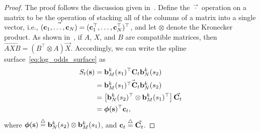 \begin{proof}
The proof follows the discussion given in~\cite{RodriguesTsiogkasAguiar20}.
%
Define the $\vec{\cdot}$ operation on a matrix to be the operation of stacking all of the columns of a matrix into a single vector, i.e., $\vec{(\mathbf{c}_1, \dots, \mathbf{c}_N)}=(\mathbf{c}_1^\top, \dots, \mathbf{c}_N^\top)^\top$, and let $\otimes$ denote the Kronecker product. As shown in~\cite{Kronecker_vect}, if $A$, $X$, and $B$ are compatible matrices, then $\vec{AXB}=(B^\top \otimes A)\vec{X}$.  Accordingly, we can write the spline surface~\eqref{eq:log_odds_surface} as
\begin{align*}
S_t(\mathbf{s}) &= \mathbf{b}_M^k(s_1)^\top \mathbf{C}_t \mathbf{b}_N^k(s_2) \\
		  &= \vec{\mathbf{b}_M^k(s_1)^\top \mathbf{C}_t \mathbf{b}_N^k(s_2)} \\
		  &= \left[\mathbf{b}_N^k(s_2)^\top \otimes \mathbf{b}_M^k(s_1)^\top \right] \vec{\mathbf{C}_t} \\
		  &= \boldsymbol{\phi}(\mathbf{s})^\top \mathbf{c}_t,
\end{align*}
where $\boldsymbol{\phi}(\mathbf{s})\stackrel{\triangle}{=} \mathbf{b}_N^k(s_2) \otimes \mathbf{b}_M^k(s_1)$, and $\mathbf{c}_t \stackrel{\triangle}{=} \vec{\mathbf{C}_t}$.


\end{proof}
